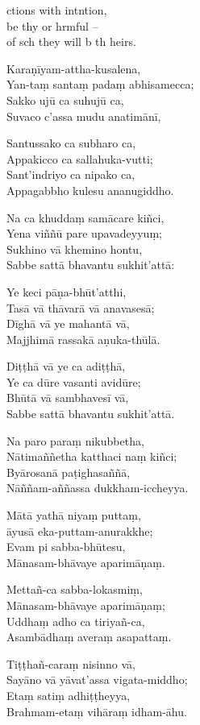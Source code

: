  ctions with intntion,\\
be thy  or hrmful --\\
of sch  they will b th heirs.

\clearpage

Karaṇīyam-attha-kusalena,\\
Yan-taṃ santaṃ padaṃ abhisamecca;\\
Sakko ujū ca suhujū ca,\\
Suvaco c'assa mudu anatimānī,

Santussako ca subharo ca,\\
Appakicco ca sallahuka-vutti;\\
Sant'indriyo ca nipako ca,\\
Appagabbho kulesu ananugiddho.

Na ca khuddaṃ samācare kiñci,\\
Yena viññū pare upavadeyyuṃ;\\
Sukhino vā khemino hontu,\\
Sabbe sattā bhavantu sukhit'attā:

Ye keci pāṇa-bhūt'atthi,\\
Tasā vā thāvarā vā anavasesā;\\
Dīghā vā ye mahantā vā,\\
Majjhimā rassakā aṇuka-thūlā.

Diṭṭhā vā ye ca adiṭṭhā,\\
Ye ca dūre vasanti avidūre;\\
Bhūtā vā sambhavesī vā,\\
Sabbe sattā bhavantu sukhit'attā.

Na paro paraṃ nikubbetha,\\
Nātimaññetha katthaci naṃ kiñci;\\
Byārosanā paṭighasaññā,\\
Nāññam-aññassa dukkham-iccheyya.

Mātā yathā niyaṃ puttaṃ,\\
āyusā eka-puttam-anurakkhe;\\
Evam pi sabba-bhūtesu,\\
Mānasam-bhāvaye aparimāṇaṃ.

Mettañ-ca sabba-lokasmiṃ,\\
Mānasam-bhāvaye aparimāṇaṃ;\\
Uddhaṃ adho ca tiriyañ-ca,\\
Asambādhaṃ averaṃ asapattaṃ.

Tiṭṭhañ-caraṃ nisinno vā,\\
Sayāno vā yāvat'assa vigata-middho;\\
Etaṃ satiṃ adhiṭṭheyya,\\
Brahmam-etaṃ vihāraṃ idham-āhu.

